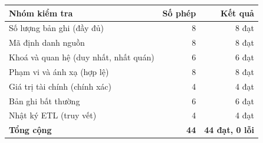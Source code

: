 \begin{tabular}{lrr}
\toprule
Nhóm kiểm tra & Số phép & Kết quả \\
\midrule
Số lượng bản ghi (đầy đủ) & 8 & 8 đạt \\
Mã định danh nguồn & 8 & 8 đạt \\
Khoá và quan hệ (duy nhất, nhất quán) & 6 & 6 đạt \\
Phạm vi và ánh xạ (hợp lệ) & 8 & 8 đạt \\
Giá trị tài chính (chính xác) & 4 & 4 đạt \\
Bản ghi bất thường & 6 & 6 đạt \\
Nhật ký ETL (truy vết) & 4 & 4 đạt \\
\textbf{Tổng cộng} & \textbf{44} & \textbf{44 đạt, 0 lỗi} \\
\bottomrule
\end{tabular}
